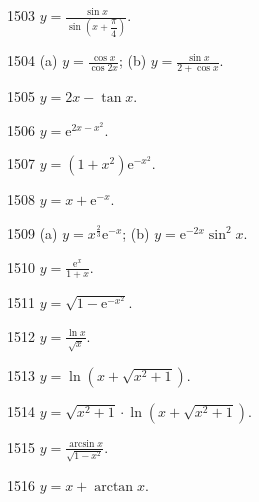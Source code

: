 \begin{prob}[S]{1503}
$y = \frac{\sin x}{\sin\left(x + \dfrac{\pi}{4}\right)}.$
\end{prob}

\begin{prob}[M]{1504}
(a) $y = \frac{\cos x}{\cos 2x}$; \qquad (b) $y = \frac{\sin x}{2 + \cos x}.$
\end{prob}

\begin{prob}[S]{1505}
$y = 2x - \tan x.$
\end{prob}

\begin{prob}[S]{1506}
$y = \mathrm{e}^{2x - x^2}.$
\end{prob}

\begin{prob}[S]{1507}
$y = (1 + x^2)\mathrm{e}^{-x^2}.$
\end{prob}

\begin{prob}[S]{1508}
$y = x + \mathrm{e}^{-x}.$
\end{prob}

\begin{prob}[M]{1509}
(a) $y = x^{\frac{2}{3}}\mathrm{e}^{-x}$; \qquad (b) $y = \mathrm{e}^{-2x}\sin^2 x.$
\end{prob}

\begin{prob}[S]{1510}
$y = \frac{\mathrm{e}^x}{1+x}.$
\end{prob}

\begin{prob}[S]{1511}
$y = \sqrt{1 - \mathrm{e}^{-x^2}}.$
\end{prob}

\begin{prob}[S]{1512}
$y = \frac{\ln x}{\sqrt{x}}.$
\end{prob}

\begin{prob}[S]{1513}
$y = \ln(x + \sqrt{x^2 + 1}).$
\end{prob}

\begin{prob}[S]{1514}
$y = \sqrt{x^2 + 1}\cdot\ln(x + \sqrt{x^2 + 1}).$
\end{prob}

\begin{prob}[S]{1515}
$y = \frac{\arcsin x}{\sqrt{1 - x^2}}.$
\end{prob}

\begin{prob}[S]{1516}
$y = x + \arctan x.$
\end{prob}

